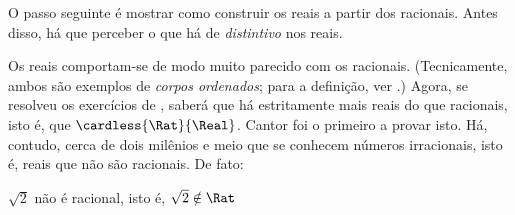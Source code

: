 \documentclass[../../../include/open-logic-section]{subfiles}
\begin{document}

O passo seguinte é mostrar como construir os reais a partir dos racionais.
Antes disso, há que perceber o que há de \emph{distintivo} nos reais.

Os reais comportam-se de modo muito parecido com os racionais. (Tecnicamente,
ambos são exemplos de \emph{corpos ordenados}; para a definição, ver
.) Agora, se resolveu os exercícios de
, saberá que há estritamente mais reais do que racionais,
isto é, que $\cardless{\Rat}{\Real}$. Cantor foi o primeiro a provar isto. Há,
contudo, cerca de dois milênios e meio que se conhecem números irracionais, isto é,
reais que não são racionais. De fato:
\begin{thm}
$\sqrt{2}$ não é racional, isto é, $\sqrt{2} \notin \Rat$
\end{thm}
\end{document}
